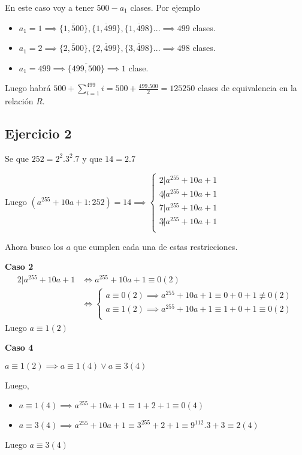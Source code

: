En este caso voy a tener $ 500 - a_1 $ clases. Por ejemplo
\begin{itemize}
    \item $ a_1 = 1 \implies \overline{\{ 1,500 \}}, \overline{\{ 1,499 \}}, \overline{\{ 1,498 \}}... \implies 499 $ clases.
    \item $ a_1 = 2 \implies \overline{\{ 2,500 \}}, \overline{\{ 2,499 \}}, \overline{\{ 3,498 \}}... \implies 498 $ clases.
    \item $ a_1 = 499 \implies \overline{\{ 499,500 \}} \implies 1 $ clase.
\end{itemize}
Luego habrá $ 500 + \sum_{i = 1}^{499}i = 500 + \frac{499.500}{2} = 125250 $ clases de equivalencia en la relación $R$.

\subsection{Ejercicio 2}

Se que $ 252 = 2^2. 3^2 .7 $ y que $ 14 = 2.7 $

Luego $ (a^{255} + 10a + 1:252) = 14 \implies \begin{cases}
    2 | a^{255} + 10a + 1 \\
    4 \not | a^{255} + 10a + 1 \\
    7 | a^{255} + 10a + 1 \\
    3 \not | a^{255} + 10a + 1 \\
\end{cases} $ 

Ahora busco los $a$ que cumplen cada una de estas restricciones.

\textbf{Caso 2}
\begin{align*}
    2 | a^{255} + 10a + 1 &\iff a^{255} + 10a + 1 \equiv 0 (2) \\
    &\iff \begin{cases}
        a \equiv 0(2) \implies a^{255} + 10a + 1 \equiv 0 + 0 + 1 \not \equiv 0(2) \\
        a \equiv 1(2) \implies a^{255} + 10a + 1 \equiv 1 + 0 + 1 \equiv 0(2) \\
    \end{cases}
\end{align*}
Luego $ a \equiv 1(2) $

\textbf{Caso 4}

$ a \equiv 1(2) \implies a \equiv 1(4) \vee a \equiv 3(4) $

Luego,
\begin{itemize}
    \item $ a \equiv 1(4) \implies a^{255} + 10a + 1 \equiv 1 + 2 + 1 \equiv 0 (4) $
    \item $ a \equiv 3(4) \implies a^{255} + 10a + 1 \equiv 3^{255} + 2 + 1 \equiv 9^{112}.3 + 3 \equiv 2 (4) $
\end{itemize}
Luego $ a \equiv 3(4) $

